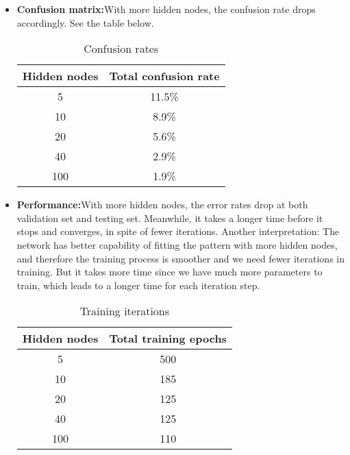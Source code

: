 \documentclass{article}
\begin{document}
{{        \begin{itemize}
            \item \textbf{Confusion matrix:}\quad With more hidden nodes, the confusion rate drops accordingly. See the table below. 
            \begin{table}[htb!]
                \centering
                \begin{tabular}{|c|c|}
                \hline
                Hidden nodes & Total confusion rate \\
                \hline
                5 & 11.5\% \\
                \hline
                10 & 8.9\% \\
                \hline
                20 & 5.6\% \\
                \hline
                40 & 2.9\% \\
                \hline
                100 & 1.9\% \\
                \hline
                \end{tabular}
                \caption{Confusion rates}
            \end{table}

            \item \textbf{Performance:}\quad With more hidden nodes, the error rates drop at both validation set and testing set. Meanwhile, it takes a longer time before it stops and converges, in spite of fewer iterations. Another interpretation: The network has better capability of fitting the pattern with more hidden nodes, and therefore the training process is smoother and we need fewer iterations in training. But it takes more time since we have much more parameters to train, which leads to a longer time for each iteration step. 
            \begin{table}[htb!]
                \centering
                \begin{tabular}{|c|c|}
                \hline
                Hidden nodes & Total training epochs \\
                \hline
                5 & 500 \\
                \hline
                10 & 185 \\
                \hline
                20 & 125 \\
                \hline
                40 & 125 \\
                \hline
                100 & 110 \\
                \hline
                \end{tabular}
                \caption{Training iterations}
            \end{table}


\end{itemize}}}
\end{document}
